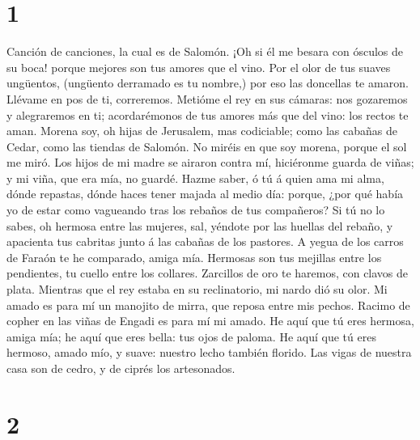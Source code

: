 \hypertarget{section}{%
\section{1}\label{section}}

 Canción de canciones, la cual es de Salomón.
 ¡Oh si él me besara con ósculos de su boca! porque
mejores son tus amores que el vino.  Por el olor de tus
suaves ungüentos, (ungüento derramado es tu nombre,) por eso las
doncellas te amaron.  Llévame en pos de ti, correremos.
Metióme el rey en sus cámaras: nos gozaremos y alegraremos en ti;
acordarémonos de tus amores más que del vino: los rectos te aman.
 Morena soy, oh hijas de Jerusalem, mas codiciable; como
las cabañas de Cedar, como las tiendas de Salomón.  No
miréis en que soy morena, porque el sol me miró. Los hijos de mi madre
se airaron contra mí, hiciéronme guarda de viñas; y mi viña, que era
mía, no guardé.  Hazme saber, ó tú á quien ama mi alma,
dónde repastas, dónde haces tener majada al medio día: porque, ¿por qué
había yo de estar como vagueando tras los rebaños de tus compañeros?
 Si tú no lo sabes, oh hermosa entre las mujeres, sal,
yéndote por las huellas del rebaño, y apacienta tus cabritas junto á las
cabañas de los pastores.  A yegua de los carros de Faraón
te he comparado, amiga mía.  Hermosas son tus mejillas
entre los pendientes, tu cuello entre los collares. 
Zarcillos de oro te haremos, con clavos de plata. 
Mientras que el rey estaba en su reclinatorio, mi nardo dió su olor.
 Mi amado es para mí un manojito de mirra, que reposa
entre mis pechos.  Racimo de copher en las viñas de
Engadi es para mí mi amado.  He aquí que tú eres hermosa,
amiga mía; he aquí que eres bella: tus ojos de paloma. 
He aquí que tú eres hermoso, amado mío, y suave: nuestro lecho también
florido.  Las vigas de nuestra casa son de cedro, y de
ciprés los artesonados.

\hypertarget{section-1}{%
\section{2}\label{section-1}}

